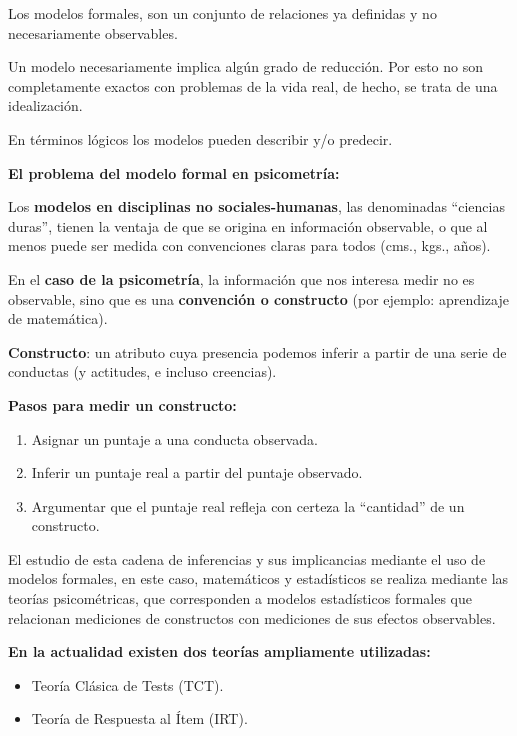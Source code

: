\documentclass[
  letterpaper,
  DIV=11,
  numbers=noendperiod]{scrreprt}
\providecommand{\tightlist}{%
  \setlength{\itemsep}{0pt}\setlength{\parskip}{0pt}}
\begin{document}
Los modelos formales, son un conjunto de relaciones ya definidas y no
necesariamente observables.

Un modelo necesariamente implica algún grado de reducción. Por esto no
son completamente exactos con problemas de la vida real, de hecho, se
trata de una idealización.

En términos lógicos los modelos pueden describir y/o predecir.

\textbf{El problema del modelo formal en psicometría:}

Los \textbf{modelos en disciplinas no sociales-humanas}, las denominadas
``ciencias duras'', tienen la ventaja de que se origina en información
observable, o que al menos puede ser medida con convenciones claras para
todos (cms., kgs., años).

En el \textbf{caso de la psicometría}, la información que nos interesa
medir no es observable, sino que es una \textbf{convención o constructo}
(por ejemplo: aprendizaje de matemática).

\textbf{Constructo}: un atributo cuya presencia podemos inferir a partir
de una serie de conductas (y actitudes, e incluso creencias).

\textbf{Pasos para medir un constructo:}

\begin{enumerate}
\def\labelenumi{\arabic{enumi}.}
\tightlist
\item
  Asignar un puntaje a una conducta observada.
\item
  Inferir un puntaje real a partir del puntaje observado.
\item
  Argumentar que el puntaje real refleja con certeza la ``cantidad'' de
  un constructo.
\end{enumerate}

El estudio de esta cadena de inferencias y sus implicancias mediante el
uso de modelos formales, en este caso, matemáticos y estadísticos se
realiza mediante las teorías psicométricas, que corresponden a modelos
estadísticos formales que relacionan mediciones de constructos con
mediciones de sus efectos observables.

\textbf{En la actualidad existen dos teorías ampliamente utilizadas:}

\begin{itemize}
\tightlist
\item
  Teoría Clásica de Tests (TCT).
\item
  Teoría de Respuesta al Ítem (IRT).
\end{itemize}
\end{document}
